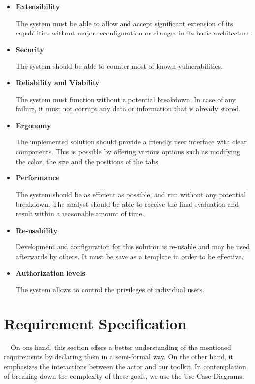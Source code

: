 \begin{itemize}[label={$\checkmark$}]

\item \textbf{Extensibility} 

The system must be able to allow and accept significant extension of its capabilities without major reconfiguration or changes in its basic architecture.

\item \textbf{Security} 

The system should be able to counter most of known vulnerabilities.

\item \textbf{Reliability and Viability} 

The system must function without a potential breakdown. In case of any failure, it must not corrupt any data or information that is already stored.


\item \textbf{Ergonomy} 

The implemented solution should provide a friendly user interface with clear components. This is possible by offering various options such as modifying the color, the size and the positions of the tabs. 


\item \textbf{Performance } 

The system should be as efficient as possible, and run without any potential breakdown. The analyst should be able to receive the final evaluation and result within a reasonable amount of time. 


\item \textbf{Re-usability }

Development and configuration for this solution is re-usable and may be used afterwards by others. It must be save as a template in order to be effective.

\item \textbf{Authorization levels } 

The system allows to control the privileges of individual users.
\end{itemize}


\section {Requirement Specification}
~~On one hand, this section offers a better understanding of the mentioned requirements by declaring them in a semi-formal way.
On the other hand, it emphasizes the interactions between the actor and our toolkit. In contemplation of breaking down the complexity of these goals, we use the Use Case Diagrams.

